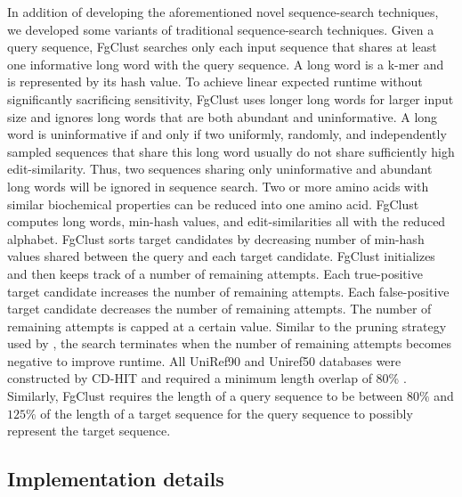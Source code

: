 \documentclass[11pt,letterpaper]{article}
\begin{document}
In addition of developing the aforementioned novel sequence-search techniques, we developed some variants of traditional sequence-search techniques.
Given a query sequence, FgClust searches only each input sequence that shares at least one informative long word with the query sequence.
A long word is a k-mer and is represented by its hash value.
To achieve linear expected runtime without significantly sacrificing sensitivity, FgClust uses longer long words for larger input size and ignores long words that are both abundant and uninformative.
A long word is uninformative if and only if two uniformly, randomly, and independently sampled sequences that share this long word usually do not share sufficiently high edit-similarity.
Thus, two sequences sharing only uninformative and abundant long words will be ignored in sequence search.
Two or more amino acids with similar biochemical properties can be reduced into one amino acid.
FgClust computes long words, min-hash values, and edit-similarities all with the reduced alphabet.
FgClust sorts target candidates by decreasing number of min-hash values shared between the query and each target candidate.
FgClust initializes and then keeps track of a number of remaining attempts.
Each true-positive target candidate increases the number of remaining attempts.
Each false-positive target candidate decreases the number of remaining attempts.
The number of remaining attempts is capped at a certain value.
Similar to the pruning strategy used by \citet{edgar2010search}, the search terminates when the number of remaining attempts becomes negative to improve runtime.
All UniRef90 and Uniref50 databases were constructed by CD-HIT and required a minimum length overlap of 80\% \citep{suzek2014uniref}.
Similarly, FgClust requires the length of a query sequence to be between \(80\%\) and \(125\%\) of the length of a target sequence for the query sequence to possibly represent the target sequence. 

\subsection{Implementation details}
\end{document}
